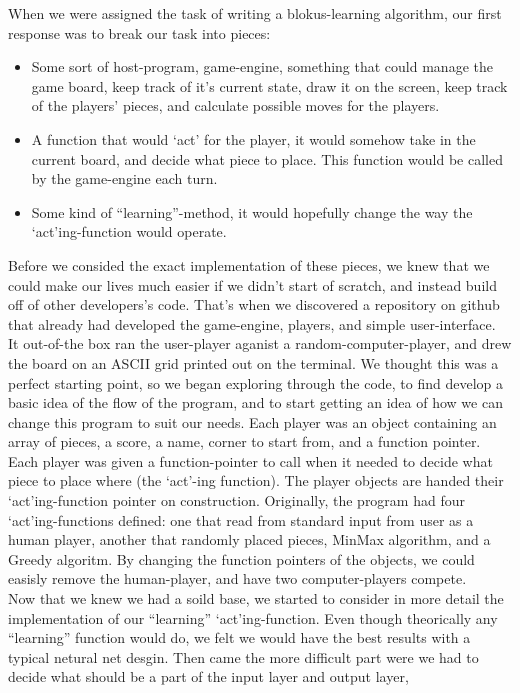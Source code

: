 \documentclass{report}
\begin{document}
	When we were assigned the task of writing a blokus-learning algorithm, our first response was to break our task into pieces:
	\begin{itemize}
		\item Some sort of host-program, game-engine, something that could manage the game board, keep track of it's current state, draw it on the screen, keep track of the players' pieces,
			and calculate possible moves for the players.
		\item A function that would `act' for the player, it would somehow take in the current board, and decide what piece to place. This function would be called by the game-engine each
			turn.
		\item Some kind of ``learning''-method, it would hopefully change the way the `act'ing-function would operate.
	\end{itemize}
	Before we consided the exact implementation of these pieces, we knew that we could make our lives much easier if we didn't start of scratch, and instead build off of other developers's code.
	That's when we discovered a repository on github that already had developed the game-engine, players, and simple user-interface.\\
	It out-of-the box ran the user-player aganist a random-computer-player, and drew the board on an ASCII grid printed out on the terminal. We thought this was a perfect starting point,
	so we began exploring through the code, to find develop	a basic idea of the flow of the program, and to start getting an idea of how we can change this program to suit our needs.
	Each player was an object containing an array of pieces, a score, a name, corner to start from, and a function pointer. Each player was given a function-pointer to call when it needed
	to decide what piece to place where (the `act'-ing function). The player objects are handed their `act'ing-function pointer on construction. Originally, the program had four `act'ing-functions
	defined: one that read from standard input from user as	a human player, another that randomly placed pieces, MinMax algorithm, and a Greedy algoritm. By changing the function pointers of
	the objects, we could easisly remove the human-player, and have two computer-players compete.\\
	Now that we knew we had a soild base, we started to consider in more detail the implementation of our ``learning'' `act'ing-function. Even though theorically any ``learning'' function would do,
	we felt we would have the best results with a typical netural net desgin. Then came the more difficult part were we had to decide what should be a part of the input layer and output layer,
\end{document}
